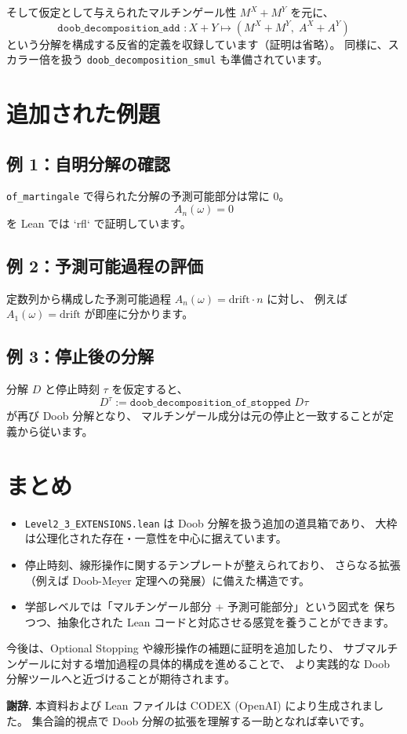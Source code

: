\documentclass[12pt]{ltjsarticle}
\theoremstyle{definition}
\theoremstyle{plain}
\begin{document}
そして仮定として与えられたマルチンゲール性
$M^X + M^Y$ を元に、
\[
  \texttt{doob\_decomposition\_add } : X+Y \mapsto (M^X+M^Y,\; A^X+A^Y)
\]
という分解を構成する反省的定義を収録しています（証明は省略）。
同様に、スカラー倍を扱う \texttt{doob\_decomposition\_smul} も準備されています。

\section{追加された例題}

\subsection*{例 1：自明分解の確認}

\texttt{of\_martingale} で得られた分解の予測可能部分は常に 0。
\[
  A_n(\omega) = 0
\]
を Lean では `rfl` で証明しています。

\subsection*{例 2：予測可能過程の評価}

定数列から構成した予測可能過程
$A_n(\omega) = \text{drift} \cdot n$ に対し、
例えば $A_1(\omega) = \text{drift}$ が即座に分かります。

\subsection*{例 3：停止後の分解}

分解 $D$ と停止時刻 $\tau$ を仮定すると、
\[
  D^\tau := \texttt{doob\_decomposition\_of\_stopped } D \tau
\]
が再び Doob 分解となり、
マルチンゲール成分は元の停止と一致することが定義から従います。

\section{まとめ}

\begin{itemize}[leftmargin=1.4em]
  \item \texttt{Level2\_3\_EXTENSIONS.lean} は Doob 分解を扱う追加の道具箱であり、
        大枠は公理化された存在・一意性を中心に据えています。
  \item 停止時刻、線形操作に関するテンプレートが整えられており、
        さらなる拡張（例えば Doob-Meyer 定理への発展）に備えた構造です。
  \item 学部レベルでは「マルチンゲール部分 + 予測可能部分」という図式を
        保ちつつ、抽象化された Lean コードと対応させる感覚を養うことができます。
\end{itemize}

今後は、Optional Stopping や線形操作の補題に証明を追加したり、
サブマルチンゲールに対する増加過程の具体的構成を進めることで、
より実践的な Doob 分解ツールへと近づけることが期待されます。

\bigskip
\noindent\textbf{謝辞.}
本資料および Lean ファイルは CODEX (OpenAI) により生成されました。
集合論的視点で Doob 分解の拡張を理解する一助となれば幸いです。
\end{document}
